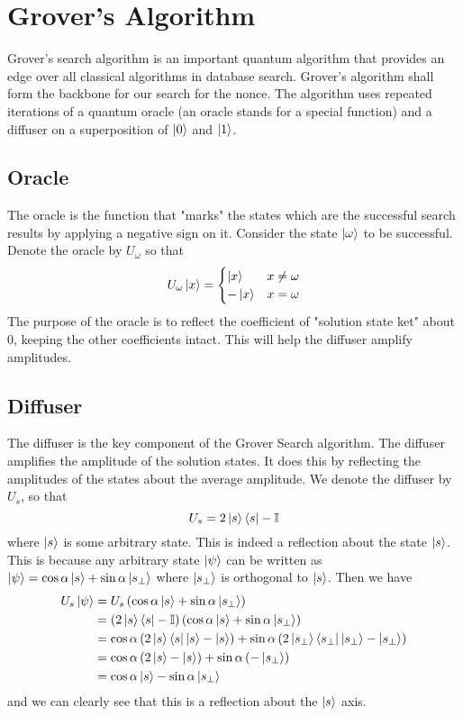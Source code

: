 \section{Grover's Algorithm}
Grover's search algorithm\cite{grover} is an important quantum algorithm that provides an edge over all classical algorithms in database search. Grover's algorithm shall form the backbone for our search for the nonce. The algorithm uses repeated iterations of a quantum oracle (an oracle stands for a special function) and a diffuser on a superposition of $\left\vert 0\right\rangle$ and $\left\vert 1\right\rangle$.
\subsection{Oracle}
The oracle is the function that "marks" the states which are the successful search results by applying a negative sign on it. Consider the state $\left\vert \omega\right\rangle$ to be successful. Denote the oracle by $U_\omega$ so that
\begin{equation}
\label{eq:5.1}
U_\omega\left\vert x\right\rangle=
\begin{cases}
\left\vert x\right\rangle&x\neq\omega\\
-\left\vert x\right\rangle&x=\omega
\end{cases}
\end{equation}
The purpose of the oracle is to reflect the coefficient of "solution state ket" about 0, keeping the other coefficients intact. This will help the diffuser amplify amplitudes.
\subsection{Diffuser}
The diffuser is the key component of the Grover Search algorithm. The diffuser amplifies the amplitude of the solution states. It does this by reflecting the amplitudes of the states about the average amplitude. We denote the diffuser by $U_s$, so that
\begin{equation}
\label{eq:5.2}
U_s=2\left\vert s\right\rangle\left\langle s\right\vert-\mathbb{I}
\end{equation}
where $\left\vert s\right\rangle$ is some arbitrary state.
This is indeed a reflection about the state $\left\vert s\right\rangle$. This is because any arbitrary state $\left\vert \psi\right\rangle$ can be written as $\left\vert \psi\right\rangle=\cos\alpha\left\vert s\right\rangle+\sin\alpha\left\vert s_\perp\right\rangle$ where $\left\vert s_\perp\right\rangle$ is orthogonal to $\left\vert s\right\rangle$. Then we have
\begin{equation}
\label{eq:5.3}
\begin{split}
U_s\left\vert \psi\right\rangle&=U_s\left(\cos\alpha\left\vert s\right\rangle+\sin\alpha\left\vert s_\perp\right\rangle\right)\\
&=\left(2\left\vert s\right\rangle\left\langle s\right\vert-\mathbb{I}\right)\left(\cos\alpha\left\vert s\right\rangle+\sin\alpha\left\vert s_\perp\right\rangle\right)\\
&=\cos\alpha\left(2\left\vert s\right\rangle\left\langle s\right\vert\left\vert s\right\rangle-\left\vert s\right\rangle\right)+\sin\alpha\left(2\left\vert s_\perp\right\rangle\left\langle s_\perp\right\vert\left\vert s_\perp\right\rangle-\left\vert s_\perp\right\rangle\right)\\
&=\cos\alpha\left(2\left\vert s\right\rangle-\left\vert s\right\rangle\right)+\sin\alpha\left(-\left\vert s_\perp\right\rangle\right)\\
&=\cos\alpha\left\vert s\right\rangle-\sin\alpha\left\vert s_\perp\right\rangle
\end{split}
\end{equation}
and we can clearly see that this is a reflection about the $\left\vert s\right\rangle$ axis.


